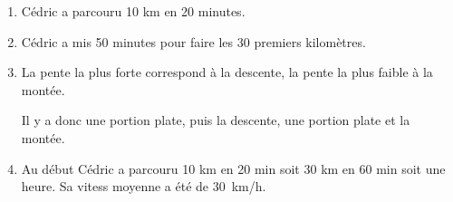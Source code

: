 
\medskip

%
%
%
%
 
\begin{enumerate}
\item %
Cédric a parcouru 10 km en 20 minutes. 
\item %
Cédric a mis 50 minutes pour faire les 30 premiers kilomètres. 
\item %

La pente la plus forte correspond à la descente, la pente la plus faible à la montée. 

Il y a donc une portion plate, puis la descente, une portion plate et la montée. 
\item %
Au début Cédric a parcouru 10 km en 20 min soit 30 km en 60 min soit une heure. Sa vitess moyenne a été de 30~km/h. 
\end{enumerate}

\vspace{0,5cm}

